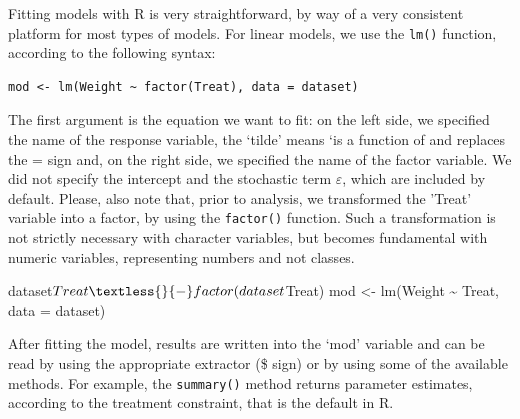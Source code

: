 \documentclass[a4paper,12pt,oneside]{book}
\newenvironment{Shaded}{\begin{snugshade}}{\end{snugshade}}
\newcommand{\SpecialCharTok}[1]{#1}
\newcommand{\OtherTok}[1]{#1}
\newcommand{\FunctionTok}[1]{#1}
\newcommand{\AttributeTok}[1]{#1}
\newcommand{\NormalTok}[1]{#1}
\begin{document}
Fitting models with R is very straightforward, by way of a very consistent platform for most types of models. For linear models, we use the \texttt{lm()} function, according to the following syntax:

\begin{verbatim}
mod <- lm(Weight ~ factor(Treat), data = dataset)
\end{verbatim}

The first argument is the equation we want to fit: on the left side, we specified the name of the response variable, the `tilde' means `is a function of and replaces the = sign and, on the right side, we specified the name of the factor variable. We did not specify the intercept and the stochastic term \(\varepsilon\), which are included by default. Please, also note that, prior to analysis, we transformed the 'Treat' variable into a factor, by using the \texttt{factor()} function. Such a transformation is not strictly necessary with character variables, but becomes fundamental with numeric variables, representing numbers and not classes.

\vspace{12pt}

\begin{Shaded}
\begin{Highlighting}[]
\NormalTok{dataset}\SpecialCharTok{$}\NormalTok{Treat }\OtherTok{\textless{}{-}} \FunctionTok{factor}\NormalTok{(dataset}\SpecialCharTok{$}\NormalTok{Treat)}
\NormalTok{mod }\OtherTok{\textless{}{-}} \FunctionTok{lm}\NormalTok{(Weight }\SpecialCharTok{\textasciitilde{}}\NormalTok{ Treat, }\AttributeTok{data =}\NormalTok{ dataset)}
\end{Highlighting}
\end{Shaded}

After fitting the model, results are written into the `mod' variable and can be read by using the appropriate extractor (\$ sign) or by using some of the available methods. For example, the \texttt{summary()} method returns parameter estimates, according to the treatment constraint, that is the default in R.

\vspace{12pt}
\scriptsize
\end{document}
